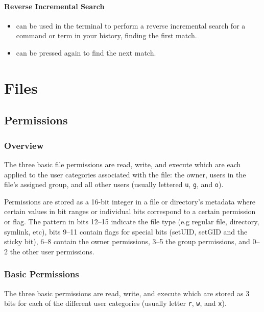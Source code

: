 \documentclass{article}
\newcommand{\code}[1]{\texttt{#1}}
\begin{document}
\paragraph{Reverse Incremental Search}

\begin{itemize}
    \item {} can be used in the terminal to perform a reverse incremental search for a command or term in your history, finding the first match.
    \item {} can be pressed again to find the next match.
\end{itemize}

\section{Files}

\subsection{Permissions}

\subsubsection{Overview}

The three basic file permissions are read, write, and execute which are each applied to the user categories associated with the file: the owner, users in the file's assigned group, and all other users (usually lettered \code{u}, \code{g}, and \code{o}).

Permissions are stored as a 16-bit integer in a file or directory's metadata where certain values in bit ranges or individual bits correspond to a certain permission or flag. The pattern in bits 12--15 indicate the file type (e.g regular file, directory, symlink, etc), bits 9--11 contain flags for special bits (setUID, setGID and the sticky bit), 6--8 contain the owner permissions, 3--5 the group permissions, and 0--2 the other user permissions.

\subsubsection{Basic Permissions}

The three basic permissions are read, write, and execute which are stored as 3 bits for each of the different user categories (usually letter \code{r}, \code{w}, and \code{x}).
\end{document}
